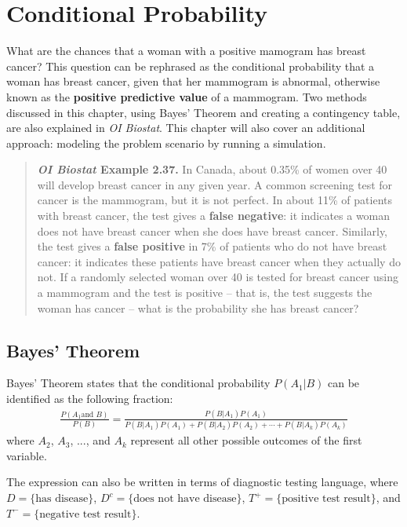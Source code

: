 \section{Conditional Probability}
What are the chances that a woman with a positive mamogram has breast cancer? This question can be rephrased as the conditional probability that a woman has breast cancer, given that her mammogram is abnormal, otherwise known as the \textbf{positive predictive value} of a mammogram. Two methods discussed in this chapter, using Bayes' Theorem and creating a contingency table, are also explained in \textit{OI Biostat}. This chapter will also cover an additional approach: modeling the problem scenario by running a simulation.

\begin{quotation}

\textbf{\textit{OI Biostat} Example 2.37.} In Canada, about 0.35\% of women over 40 will develop breast cancer in any given year. A common screening test for cancer is the mammogram, but it is not perfect. In about 11\% of patients with breast cancer, the test gives a \textbf{false negative}: it indicates a woman does not have breast cancer when she does have breast cancer. Similarly, the test gives a \textbf{false positive} in 7\% of patients who do not have breast cancer: it indicates these patients have breast cancer when they actually do not. If a randomly selected woman over 40 is tested for breast cancer using a mammogram and the test is positive -- that is, the test suggests the woman has cancer -- what is the probability she has breast cancer?

\end{quotation}

\subsection{Bayes' Theorem}

Bayes' Theorem states that the conditional probability $P(A_1 | B)$ can be identified as the following fraction:\vspace{-1.5mm}
\begin{align*}
\frac{P(A_1 \text{and } B)}{P(B)}= \frac{P(B | A_1) P(A_1)}
	{P(B | A_1) P(A_1) + P(B | A_2) P(A_2) + \cdots + P(B | A_k) P(A_k)}
\end{align*}
where $A_2$, $A_3$, ..., and $A_k$ represent all other possible outcomes of the first variable.

The expression can also be written in terms of diagnostic testing language, where $D = \text{\{has disease\}}$, $D^c = \text{\{does not have disease\}}$, $T^{+} = \text{\{positive test result\}}$, and $T^{-} = \text{\{negative test result\}}$.

